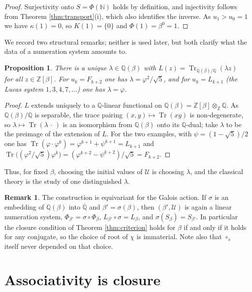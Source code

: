 \documentclass[11pt,reqno]{amsart}
\theoremstyle{plain}
\newtheorem{proposition}[theorem]{Proposition}
\theoremstyle{definition}
\newtheorem{remark}[theorem]{Remark}
\newcommand{\Z}{\mathbb{Z}}
\newcommand{\N}{\mathbb{N}}
\newcommand{\Q}{\mathbb{Q}}
\newcommand{\Uu}{\mathcal{U}}
\newcommand{\Tr}{\operatorname{Tr}}
\begin{document}
\begin{proof}
Surjectivity onto $S=\Phi(\N)$ holds by definition, and injectivity follows from
Theorem \ref{thm:transport}(i), which also identifies the inverse. As $u_{1}>u_{0}=1$ we have
$\kappa(1)=0$, so $K(1)=\{0\}$ and $\Phi(1)=\beta^{0}=1$.
\end{proof}

We record two structural remarks; neither is used later, but both clarify what the data of a
numeration system amounts to.

\begin{proposition}\label{prop:trace}
There is a unique $\lambda\in\Q(\beta)$ with
$L(z)=\Tr_{\Q(\beta)/\Q}(\lambda z)$ for all $z\in\Z[\beta]$. For $u_{k}=F_{k+2}$ one has
$\lambda=\varphi^{2}/\sqrt5$, and for $u_{k}=L_{k+1}$ (the Lucas system $1,3,4,7,\dots$) one has
$\lambda=\varphi$.
\end{proposition}

\begin{proof}
$L$ extends uniquely to a $\Q$-linear functional on $\Q(\beta)=\Z[\beta]\otimes_{\Z}\Q$. As
$\Q(\beta)/\Q$ is separable, the trace pairing $(x,y)\mapsto\Tr(xy)$ is non-degenerate, so
$\lambda\mapsto\Tr(\lambda\,\cdot\,)$ is an isomorphism from $\Q(\beta)$ onto its $\Q$-dual; take
$\lambda$ to be the preimage of the extension of $L$. For the two examples, with
$\psi=(1-\sqrt5)/2$ one has $\Tr(\varphi\cdot\varphi^{k})=\varphi^{k+1}+\psi^{k+1}=L_{k+1}$ and
$\Tr\bigl((\varphi^{2}/\sqrt5)\varphi^{k}\bigr)=(\varphi^{k+2}-\psi^{k+2})/\sqrt5=F_{k+2}$.
\end{proof}

Thus, for fixed $\beta$, choosing the initial values of $\Uu$ is choosing $\lambda$, and the
classical theory is the study of one distinguished $\lambda$.

\begin{remark}\label{rem:galois}
The construction is equivariant for the Galois action. If $\sigma$ is an embedding of $\Q(\beta)$
into $\overline{\Q}$ and $\beta'=\sigma(\beta)$, then $(\beta',\Uu)$ is again a linear numeration
system, $\Phi_{\beta'}=\sigma\circ\Phi_{\beta}$, $L_{\beta'}\circ\sigma=L_{\beta}$, and
$\sigma(S_{\beta})=S_{\beta'}$. In particular the closure condition of Theorem \ref{thm:criterion}
holds for $\beta$ if and only if it holds for any conjugate, so the choice of root of $\chi$ is
immaterial. Note also that $\circ_{s}$ itself never depended on that choice.
\end{remark}

\section{Associativity is closure}
\end{document}
